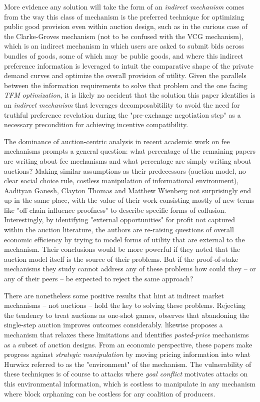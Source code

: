 More evidence any solution will take the form of an \textit{indirect mechanism} comes from the way this class of mechanism is the preferred technique for optimizing public good provision even within auction design, such as in the curious case of the Clarke-Groves mechanism (not to be confused with the VCG mechanism), which is an indirect mechanism in which users are asked to submit bids across bundles of goods, some of which may be public goods, and where this indirect preference information is leveraged to intuit the comparative shape of the private demand curves and optimize the overall provision of utility. Given the parallels between the information requirements to solve that problem and the one facing \textit{TFM optimization}, it is likely no accident that the solution this paper identifies is an \textit{indirect mechanism} that leverages decomposabitility to avoid the need for truthful preference revelation during the "pre-exchange negotiation step" as a necessary precondition for achieving incentive compatibility.

The dominance of auction-centric analysis in recent academic work on fee mechanisms prompts a general question: what percentage of the remaining papers are writing about fee mechanisms and what percentage are simply writing about auctions? Making similar assumptions as their predecessors (auction model, no clear social choice rule, costless manipulation of informational environment), Aadityan Ganesh, Clayton Thomas and Matthew Wienberg not surprisingly end up in the same place, with the value of their work consisting mostly of new terms like "off-chain influence proofness" to describe specific forms of collusion. Interestingly, by identifying "external opportunities" for profit not captured within the auction literature, the authors are re-raising questions of overall economic efficiency by trying to model forms of utility that are external to the mechanism. Their conclusions would be more powerful if they noted that the auction model itself is the source of their problems. But if the proof-of-stake mechanisms they study cannot address any of these problems how could they -- or any of their peers -- be expected to reject the same approach?

There are nonetheless some positive results that hint at indirect market mechanisms -- not auctions -- hold the key to solving these problems. Rejecting the tendency to treat auctions as one-shot games, \citet{ferreira2021dynamic} observes that abandoning the single-step auction improves outcomes considerably. \citet{chen2022bayesian} likewise proposes a mechanism that relaxes these limitations and identifies \textit{posted-price} mechanisms as a subset of auction designs. From an economic perspective, these papers make progress against \textit{strategic manipulation} by moving pricing information into what Hurwicz referred to as the "environment" of the mechanism. The vulnerability of these techniques is of course to attacks where \textit{goal conflict} motivates attacks on this environmental information, which is costless to manipulate in any mechanism where block orphaning can be costless for any coalition of producers.

